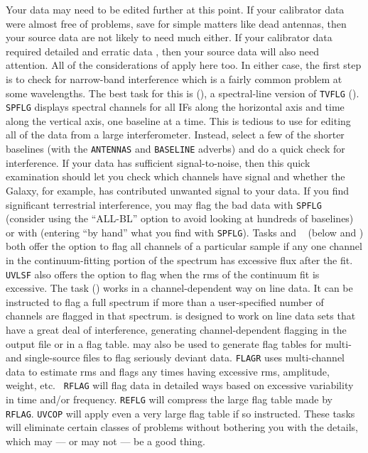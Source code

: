      Your data may need to be edited further at this point.  If your
calibrator data were almost free of problems, save for simple matters
like dead antennas, then your source data are not likely to need much
 either.  If your calibrator data required detailed and
erratic data , then your source data will also need
attention.  All of the considerations of  apply here too.
In either case, the first step is to check for narrow-band interference
which is a fairly common problem at some wavelengths.  The best task
for this is {\tt {}} (), a spectral-line version
of {\tt TVFLG} ().  {\tt SPFLG} displays spectral channels
for all IFs along the horizontal axis and time along the vertical
axis, one baseline at a time.  This is tedious to use for editing all
of the data from a large interferometer. Instead, select a few of
the shorter baselines (with the {\tt ANTENNAS} and {\tt BASELINE}
adverbs) and do a quick check for interference.  If your data has
sufficient signal-to-noise, then this quick examination should let you
check which channels have signal and whether the Galaxy, for example,
has contributed unwanted signal to your data.  If you find significant
terrestrial interference, you may flag the bad data with {\tt SPFLG}
(consider using the ``ALL-BL'' option to avoid looking at hundreds of
baselines) or with {\tt {}} (entering ``by hand'' what you
find with {\tt SPFLG}).  Tasks {\tt {}} and {\tt
{}} (below and ) both offer the option to flag
all channels of a particular sample if any one channel in the
continuum-fitting portion of the spectrum has excessive flux after the
fit.  {\tt UVLSF} also offers the option to flag when the rms of the
continuum fit is excessive.  The task {\tt {}}
() works in a channel-dependent way on line data. It can
be instructed to flag a full spectrum if more than a user-specified
number of channels are flagged in that spectrum.  {\tt {}}
is designed to work on line data sets that have a great deal of
interference, generating channel-dependent flagging in the output file
or in a flag table.  {\tt {}} may also be used to generate
flag tables for multi- and single-source files to flag seriously
deviant data.  {\tt FLAGR} uses multi-channel data to estimate rms and
flags any times having excessive rms, amplitude, weight, etc.  {\tt
RFLAG} will flag data in detailed ways based on excessive variability
in time and/or frequency.  {\tt REFLG} will compress the large flag
table made by {\tt RFLAG}\@.  {\tt UVCOP} will apply even a very large
flag table if so instructed.  These tasks will eliminate certain
classes of problems without bothering you with the details, which may
--- or may not --- be a good thing.

